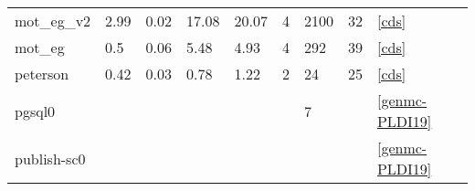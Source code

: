 {\begin{tabular}{lllllllll}
\multicolumn{1}{l|}{mot\_eg\_v2}                  & \multicolumn{1}{l|}{2.99}       & \multicolumn{1}{l|}{0.02} & \multicolumn{1}{l|}{17.08}     & \multicolumn{1}{l|}{20.07} & \multicolumn{1}{l|}{4}                                                                          & \multicolumn{1}{l|}{2100}                                                                        & \multicolumn{1}{l|}{32}                                                                                    & \ref{cds}          \\
\multicolumn{1}{l|}{mot\_eg}                      & \multicolumn{1}{l|}{0.5}        & \multicolumn{1}{l|}{0.06} & \multicolumn{1}{l|}{5.48}      & \multicolumn{1}{l|}{4.93}  & \multicolumn{1}{l|}{4}                                                                          & \multicolumn{1}{l|}{292}                                                                         & \multicolumn{1}{l|}{39}                                                                                    & \ref{cds}          \\
\multicolumn{1}{l|}{peterson}                     & \multicolumn{1}{l|}{0.42}       & \multicolumn{1}{l|}{0.03} & \multicolumn{1}{l|}{0.78}      & \multicolumn{1}{l|}{1.22}  & \multicolumn{1}{l|}{2}                                                                          & \multicolumn{1}{l|}{24}                                                                          & \multicolumn{1}{l|}{25}                                                                                    & \ref{cds}          \\
\multicolumn{1}{l|}{pgsql0}                       & \multicolumn{1}{l|}{}           & \multicolumn{1}{l|}{}     & \multicolumn{1}{l|}{}          & \multicolumn{1}{l|}{}      & \multicolumn{1}{l|}{}                                                                           & \multicolumn{1}{l|}{7}                                                                           & \multicolumn{1}{l|}{}                                                                                      & \ref{genmc-PLDI19} \\
\multicolumn{1}{l|}{publish-sc0}                  & \multicolumn{1}{l|}{}           & \multicolumn{1}{l|}{}     & \multicolumn{1}{l|}{}          & \multicolumn{1}{l|}{}      & \multicolumn{1}{l|}{}                                                                           & \multicolumn{1}{l|}{}                                                                            & \multicolumn{1}{l|}{}                                                                                      & \ref{genmc-PLDI19} \\

\end{tabular}}
